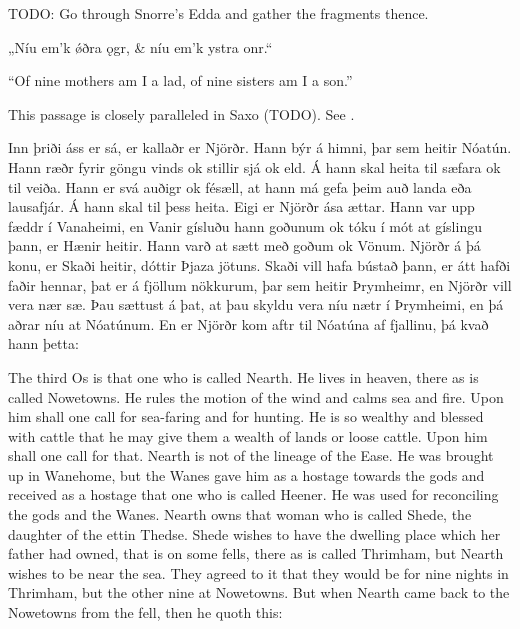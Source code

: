 
TODO: Go through Snorre’s Edda and gather the fragments thence.

\sectionline

\bva „Níu em’k ǿðra ǫgr, &
níu em’k ystra onr.“\eva

\bvb “Of nine mothers am I a lad, of nine sisters am I a son.”\evb
\evg

\sectionline

This passage is closely paralleled in Saxo (TODO). See \textcite{Hopkins2021}.

\bpg\bpa Inn þriði áss er sá, er kallaðr er Njörðr. Hann býr á himni, þar sem heitir Nóatún. Hann ræðr fyrir göngu vinds ok stillir sjá ok eld. Á hann skal heita til sæfara ok til veiða. Hann er svá auðigr ok fésæll, at hann má gefa þeim auð landa eða lausafjár. Á hann skal til þess heita. Eigi er Njörðr ása ættar. Hann var upp fæddr í Vanaheimi, en Vanir gísluðu hann goðunum ok tóku í mót at gíslingu þann, er Hænir heitir. Hann varð at sætt með goðum ok Vönum. Njörðr á þá konu, er Skaði heitir, dóttir Þjaza jötuns. Skaði vill hafa bústað þann, er átt hafði faðir hennar, þat er á fjöllum nökkurum, þar sem heitir Þrymheimr, en Njörðr vill vera nær sæ. Þau sættust á þat, at þau skyldu vera níu nætr í Þrymheimi, en þá aðrar níu at Nóatúnum. En er Njörðr kom aftr til Nóatúna af fjallinu, þá kvað hann þetta:\epa

\bpb The third Os is that one who is called Nearth. He lives in heaven, there as is called Nowetowns. He rules the motion of the wind and calms sea and fire. Upon him shall one call for sea-faring and for hunting. He is so wealthy and blessed with cattle that he may give them a wealth of lands or loose cattle. Upon him shall one call for that. Nearth is not of the lineage of the Ease. He was brought up in Wanehome, but the Wanes gave him as a hostage towards the gods and received as a hostage that one who is called Heener. He was used for reconciling the gods and the Wanes. Nearth owns that woman who is called Shede, the daughter of the ettin Thedse. Shede wishes to have the dwelling place which her father had owned, that is on some fells, there as is called Thrimham, but Nearth wishes to be near the sea. They agreed to it that they would be for nine nights in Thrimham, but the other nine at Nowetowns. But when Nearth came back to the Nowetowns from the fell, then he quoth this:\epb\epg


